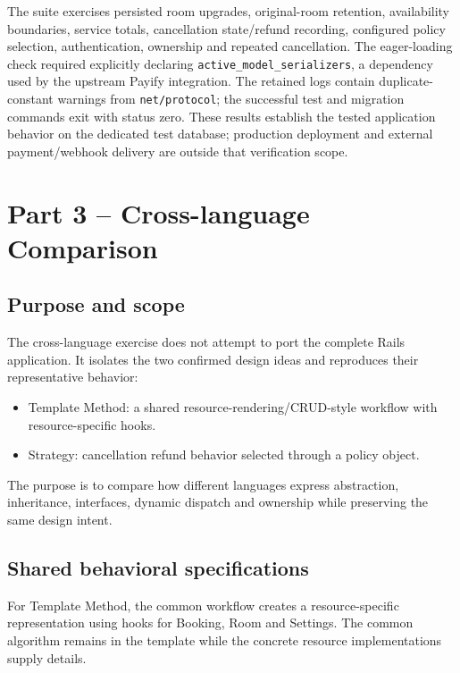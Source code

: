 \documentclass[10pt,a4paper]{article}
\newcommand{\code}[1]{\texttt{\small #1}}
\begin{document}
The suite exercises persisted room upgrades, original-room retention, availability boundaries, service totals, cancellation state/refund recording, configured policy selection, authentication, ownership and repeated cancellation. The eager-loading check required explicitly declaring \code{active\_model\_serializers}, a dependency used by the upstream Payify integration. The retained logs contain duplicate-constant warnings from \code{net/protocol}; the successful test and migration commands exit with status zero. These results establish the tested application behavior on the dedicated test database; production deployment and external payment/webhook delivery are outside that verification scope.

\section{Part 3 -- Cross-language Comparison}

\subsection{Purpose and scope}

The cross-language exercise does not attempt to port the complete Rails application. It isolates the two confirmed design ideas and reproduces their representative behavior:

\begin{itemize}[leftmargin=*]
\item Template Method: a shared resource-rendering/CRUD-style workflow with resource-specific hooks.
\item Strategy: cancellation refund behavior selected through a policy object.
\end{itemize}

The purpose is to compare how different languages express abstraction, inheritance, interfaces, dynamic dispatch and ownership while preserving the same design intent.

\subsection{Shared behavioral specifications}

For Template Method, the common workflow creates a resource-specific representation using hooks for Booking, Room and Settings. The common algorithm remains in the template while the concrete resource implementations supply details.
\end{document}
